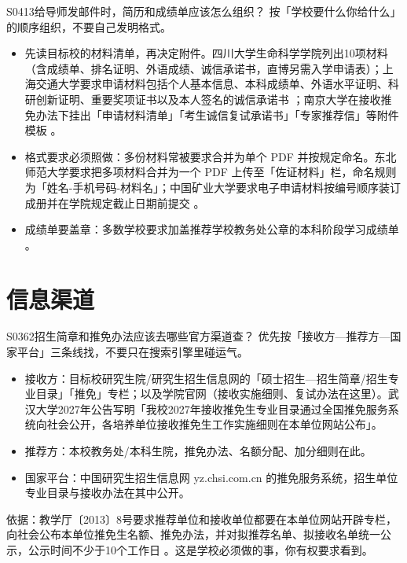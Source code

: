 \begin{qa}{S0413}{给导师发邮件时，简历和成绩单应该怎么组织？}
按「学校要什么你给什么」的顺序组织，不要自己发明格式。
\begin{itemize}
  \item 先读目标校的材料清单，再决定附件。四川大学生命科学学院列出10项材料（含成绩单、排名证明、外语成绩、诚信承诺书，直博另需入学申请表）；上海交通大学要求申请材料包括个人基本信息、本科成绩单、外语水平证明、科研创新证明、重要奖项证书以及本人签名的诚信承诺书 ；南京大学在接收推免办法下挂出「申请材料清单」「考生诚信复试承诺书」「专家推荐信」等附件模板 。
  \item 格式要求必须照做：多份材料常被要求合并为单个 PDF 并按规定命名。东北师范大学要求把多项材料合并为一个 PDF 上传至「佐证材料」栏，命名规则为「姓名-手机号码-材料名」；中国矿业大学要求电子申请材料按编号顺序装订成册并在学院规定截止日期前提交 。
  \item 成绩单要盖章：多数学校要求加盖推荐学校教务处公章的本科阶段学习成绩单 。
\end{itemize}
\end{qa}

\section{信息渠道}
\begin{qa}{S0362}{招生简章和推免办法应该去哪些官方渠道查？}
优先按「接收方—推荐方—国家平台」三条线找，不要只在搜索引擎里碰运气。
\begin{itemize}
  \item 接收方：目标校研究生院/研究生招生信息网的「硕士招生—招生简章/招生专业目录」「推免」专栏；以及学院官网（接收实施细则、复试办法在这里）。武汉大学2027年公告写明「我校2027年接收推免生专业目录通过全国推免服务系统向社会公开，各培养单位接收推免生工作实施细则在本单位网站公布」。
  \item 推荐方：本校教务处/本科生院，推免办法、名额分配、加分细则在此。
  \item 国家平台：中国研究生招生信息网 yz.chsi.com.cn 的推免服务系统，招生单位专业目录与接收办法在其中公开。
\end{itemize}
依据：教学厅〔2013〕8号要求推荐单位和接收单位都要在本单位网站开辟专栏，向社会公布本单位推免生名额、推免办法，并对拟推荐名单、拟接收名单统一公示，公示时间不少于10个工作日 。这是学校必须做的事，你有权要求看到。
\end{qa}

